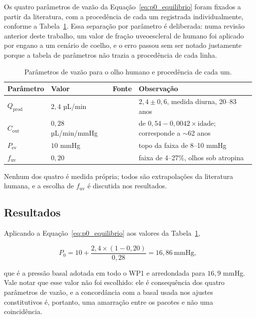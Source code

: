 Os quatro parâmetros de vazão da Equação~\ref{eq:p0_equilibrio} foram fixados a partir da literatura, com a procedência de cada um registrada individualmente, conforme a Tabela~\ref{tab:wp42_params}. Essa separação por parâmetro é deliberada: numa revisão anterior deste trabalho, um valor de fração uveoescleral de humano foi aplicado por engano a um cenário de coelho, e o erro passou sem ser notado justamente porque a tabela de parâmetros não trazia a procedência de cada linha.

\begin{table}[h]
\centering
\small
\caption{Parâmetros de vazão para o olho humano e procedência de cada um.}
\label{tab:wp42_params}
\begin{tabular}{@{}llll@{}}
\toprule
Parâmetro & Valor & Fonte & Observação \\
\midrule
$Q_{\mathrm{prod}}$ & $2{,}4$ µL/min & \citet{goel2010} & $2{,}4\pm0{,}6$, medida diurna, 20--83 anos \\
$C_{\mathrm{out}}$ & $0{,}28$ µL/min/mmHg & \citet{kaufmanalm} & de $0{,}54-0{,}0042\times\text{idade}$; corresponde a $\sim$62 anos \\
$P_{\mathrm{ev}}$ & $10$ mmHg & \citet{phelps1978} & topo da faixa de 8--10 mmHg \\
$f_{\mathrm{uv}}$ & $0{,}20$ & \citet{bill1971} & faixa de 4--27\%, olhos sob atropina \\
\bottomrule
\end{tabular}

\vspace{2pt}
\footnotesize Nenhum dos quatro é medida própria; todos são extrapolações da literatura humana, e a escolha de $f_{\mathrm{uv}}$ é discutida nos resultados.
\end{table}

\subsection{Resultados}

Aplicando a Equação~\ref{eq:p0_equilibrio} aos valores da Tabela~\ref{tab:wp42_params},

\begin{equation}
P_{0}=10+\frac{2{,}4\times(1-0{,}20)}{0{,}28}=16{,}86\ \text{mmHg},
\label{eq:p0_humano}
\end{equation}

que é a pressão basal adotada em todo o WP1 e arredondada para $16{,}9$ mmHg. Vale notar que esse valor não foi escolhido: ele é consequência dos quatro parâmetros de vazão, e a concordância com a basal usada nos ajustes constitutivos é, portanto, uma amarração entre os pacotes e não uma coincidência.

